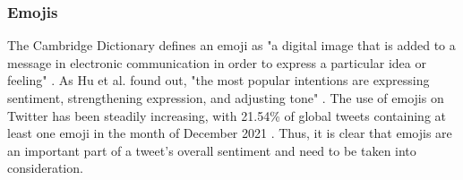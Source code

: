 
\subsubsection{Emojis}
The Cambridge Dictionary defines an emoji as "a digital image that is added to a message in electronic communication in order to express a particular idea or feeling" \cite{cambridgeEmoji}. As Hu et al. found out, "the most popular intentions are expressing sentiment, strengthening expression, and adjusting tone" \cite[p.~109]{Hu_Guo_Sun_Nguyen_Luo_2017}. The use of emojis on Twitter has been steadily increasing, with 21.54\% of global tweets containing at least one emoji in the month of December 2021 \cite{emojiStatistic}. Thus, it is clear that emojis are an important part of a tweet's overall sentiment and need to be taken into consideration.







